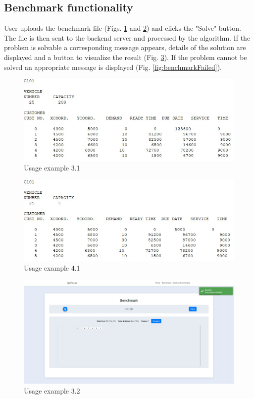 \documentclass[a4paper,twoside,12pt]{book}
\begin{document}
\subsection{Benchmark functionality}
User uploads the benchmark file (Figs. \ref{fig:benchmarkFile1} and \ref{fig:benchmarkFile2}) and clicks the "Solve" button. The file is then sent to the backend server and processed by the algorithm. If the problem is solvable a corresponding message appears, details of the solution are displayed and a button to visualize the result (Fig. \ref{fig:benchmarkSuccess}). If the problem cannot be solved an appropriate message is displayed (Fig. \ref{fig:benchmarkFailed}).

\begin{figure}[H]
\centering
\includegraphics[scale=0.7]{images/benchmarkFile1.jpg}
\caption{Usage example 3.1}
\label{fig:benchmarkFile1}
\end{figure}

\begin{figure}[H]
\centering
\includegraphics[scale=0.7]{images/benchmarkFile2.jpg}
\caption{Usage example 4.1}
\label{fig:benchmarkFile2}
\end{figure}

\begin{figure}[H]
\centering
\includegraphics[scale=0.3]{images/benchmarkSuccess.jpg}
\caption{Usage example 3.2}
\label{fig:benchmarkSuccess}
\end{figure}
\end{document}
